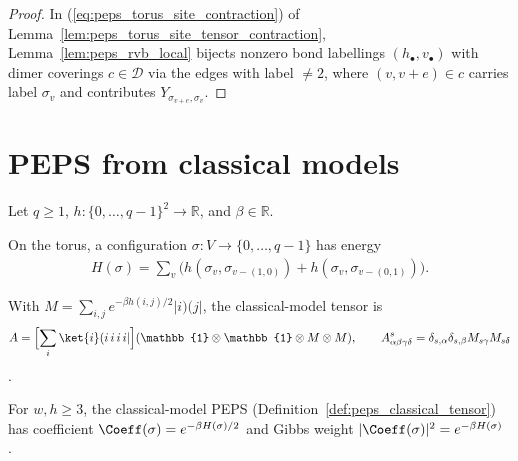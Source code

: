 \begin{proof}\leanok
    In (\ref{eq:peps_torus_site_contraction}) of
    Lemma~\ref{lem:peps_torus_site_tensor_contraction},
    Lemma~\ref{lem:peps_rvb_local} bijects nonzero bond labellings $(h_\bullet,v_\bullet)$
    with dimer coverings $c\in\mathcal D$ via the edges with label $\neq 2$,
    where $(v,v+e)\in c$ carries label $\sigma_v$ and contributes
    $Y_{\sigma_{v+e},\sigma_v}$.
\end{proof}

\section{PEPS from classical models}%
\label{sec:peps_classical_models}

Let $q\ge 1$, $h\colon\{0,\ldots,q-1\}^{2}\to\mathbb{R}$, and $\beta\in\mathbb{R}$.

\begin{definition}%
    \label{def:peps_classical_energy}
    \leanok
    On the torus, a configuration $\sigma:V\to\{0,\ldots,q-1\}$ has energy
    \begin{align}
        H(\sigma)=\sum_{v}\bigl(h(\sigma_{v},\sigma_{v-(1,0)})
        +h(\sigma_{v},\sigma_{v-(0,1)})\bigr).
        \label{eq:peps_classical_energy_def}
    \end{align}
\end{definition}

\begin{definition}%
    \label{def:peps_classical_tensor}
    \leanok
    With $M=\sum_{i,j}e^{-\beta h(i,j)/2}|i)(j|$, the classical-model tensor is
    \begin{align}
        A=\Bigl[\sum_{i}\ket{i}(i\,i\,i\,i|\Bigr]
        (\mathbb{1}\otimes\mathbb{1}\otimes M\otimes M),
        \qquad
        A^s_{\alpha\beta\gamma\delta}=\delta_{s,\alpha}\delta_{s,\beta}M_{s\gamma}M_{s\delta}
        \notag
    \end{align}
    \cite[Appendix~A, ``PEPS from classical models'']{Cirac2021Matrix}.
\end{definition}

\begin{lemma}%
    \label{thm:peps_classical_coeff}
    \leanok
    For $w,h\ge 3$, the classical-model PEPS
    (Definition~\ref{def:peps_classical_tensor}) has coefficient
    $\Coeff(\sigma)=e^{-\beta H(\sigma)/2}$ and Gibbs weight
    $|\Coeff(\sigma)|^{2}=e^{-\beta H(\sigma)}$
    \cite{gap:rmp_peps_examples_small_torus}.
\end{lemma}

